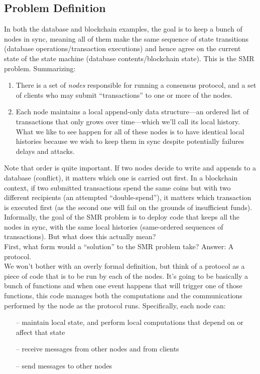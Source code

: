 \subsection{Problem Definition}
In both the database and blockchain examples, the goal is to keep a bunch of nodes in
sync, meaning all of them make the same sequence of state transitions (database operations/transaction executions) and hence agree on the current state of the state machine
(database contents/blockchain state). This is the SMR problem. Summarizing:
\begin{enumerate}
    \item There is a set of \textit{nodes} responsible for running a consensus protocol, and a set of clients who may submit “transactions” to one or more of the nodes.
    \item Each node maintains a local append-only data structure—an ordered list of transactions that only grows over time—which we’ll call its local history. What we like to see happen for all of these nodes is to have identical local histories because we wish to keep them in sync despite potentially failures delays and attacks.
\end{enumerate}


Note that order is quite important. If two nodes decide to write and appends to a database (conflict), it matters which one is carried out first. In a blockchain context, if two submitted transactions spend the same coins but with two different recipients (an attempted “double-spend”), it matters which transaction is executed first (as the second one will fail on the grounds of insufficient funds).
Informally, the goal of the SMR problem is to deploy code that keeps all the nodes in
sync, with the same local histories (same-ordered sequences of transactions). But what does this actually mean?\\
First, what form would a “solution” to the SMR problem take? Answer: A protocol.\\
We won’t bother with an overly formal definition, but think of a protocol as a piece of code
that is to be run by each of the nodes. It's going to
be basically a bunch of functions and when one event happens that will
trigger one of those functions, this code manages both the computations and the
communications performed by the node as the protocol runs. Specifically, each node can:
\begin{itemize}
    \item[--]  maintain local state, and perform local computations that depend on or affect that state
    \item[--] receive messages from other nodes and from clients
    \item[--] send messages to other nodes
\end{itemize}


